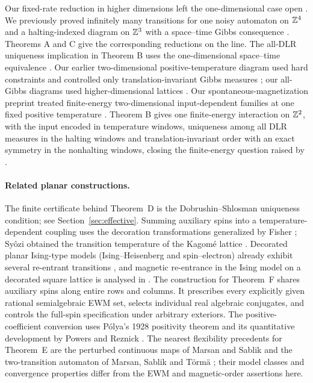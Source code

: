 Our fixed-rate reduction in higher dimensions left the one-dimensional case open \cite{dmForgetting}. We previously proved infinitely many transitions for one noisy automaton on \(\mathbb Z^4\) \cite{dmWindows} and a halting-indexed diagram on \(\mathbb Z^3\) with a space--time Gibbs consequence \cite{dmNoise}. Theorems A and C give the corresponding reductions on the line. The all-DLR uniqueness implication in Theorem B uses the one-dimensional space--time equivalence \cite{dmSpaceTime}. Our earlier two-dimensional positive-temperature diagram used hard constraints and controlled only translation-invariant Gibbs measures \cite{dmHard}; our all-Gibbs diagrams used higher-dimensional lattices \cite{dmNoise}. Our spontaneous-magnetization preprint treated finite-energy two-dimensional input-dependent families at one fixed positive temperature \cite{dmMagnetization}. Theorem B gives one finite-energy interaction on \(\mathbb Z^2\), with the input encoded in temperature windows, uniqueness among all DLR measures in the halting windows and translation-invariant order with an exact symmetry in the nonhalting windows, closing the finite-energy question raised by \cite{dmHard}.

\paragraph{Related planar constructions.}
The finite certificate behind Theorem~D is the Dobrushin--Shlosman uniqueness condition; see Section~\ref{sec:effective}. Summing auxiliary spins into a temperature-dependent coupling uses the decoration transformations generalized by Fisher \cite{fisher}; Sy\^ozi obtained the transition temperature of the Kagom\'e lattice \cite{syozi}. Decorated planar Ising-type models (Ising--Heisenberg and spin--electron) already exhibit several re-entrant transitions \cite{canovaStrecka,cencarikovaStreckaLyra}, and magnetic re-entrance in the Ising model on a decorated square lattice is analysed in \cite{zarubinKassanOgly}. The construction for Theorem~F shares auxiliary spins along entire rows and columns. It prescribes every explicitly given rational semialgebraic EWM set, selects individual real algebraic conjugates, and controls the full-spin specification under arbitrary exteriors. The positive-coefficient conversion uses P\'olya's 1928 positivity theorem and its quantitative development by Powers and Reznick \cite{powersReznick}. The nearest flexibility precedents for Theorem~E are the perturbed continuous maps of Marsan and Sablik \cite{msMaps} and the two-transition automaton of Marsan, Sablik and T\"orm\"a \cite{mst}; their model classes and convergence properties differ from the EWM and magnetic-order assertions here.

